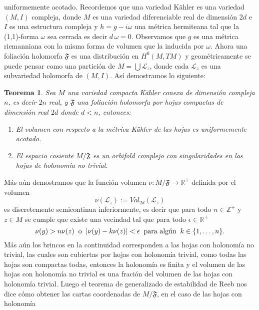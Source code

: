 \documentclass[letterpaper]{report}
\newtheorem{teorema}{Teorema}[chapter]
\newcommand{\zah}{\ensuremath{ \mathbb Z }}
\newcommand{\re}{\ensuremath{\mathbb R }}
\begin{document}
uniformemente acotado. Recordemos que una variedad K\"ahler es una variedad $(M,I)$ compleja, donde $M$ es una variedad 
diferenciable real de dimensi\'on $2d$ e $I$ es una estructura compleja y $h=g-i\omega$ una m\'etrica hermiteana tal que la (1,1)-forma $\omega$ sea cerrada
es decir $d\,\omega=0$. Observamos que $g$ es una m\'etrica riemanniana con la misma forma de volumen que la inducida por $\omega$. Ahora 
una foliaci\'on holomorfa $\mathfrak{F}$ es una distribuci\'on en $H^0(M,TM)$ y geom\'etricamente se puede pensar como una partici\'on 
de $M=\bigcup\mathcal{L}_z$, donde cada $\mathcal{L}_z$ es una subvariedad holomorfa de $(M,I)$. As\'i demostramos lo siguiente:
\begin{teorema}\label{EMS*}
        Sea $M$ una variedad compacta K\"ahler conexa de dimensi\'on compleja $n$, es decir $2n$ real, y $\mathfrak{F}$ una foliaci\'on holomorfa por hojas
        compactas de dimensi\'on real $2d$ donde $d<n$, entonces:
        \begin{enumerate}
                \item[a)] El volumen con respecto a la m\'etrica K\"ahler de las hojas es uniformemente acotado.
                \item[b)] El espacio cosiente $M/\mathfrak{F}$ es un orbifold complejo con singularidades en las hojas de holonomia no trivial.
        \end{enumerate}
\end{teorema}
M\'as a\'un demostramos que la funci\'on volumen $\nu:M/\mathfrak{F}\rightarrow\re^{+}$ definida por el volumen 
\[
        \nu(\mathcal{L}_z):=Vol_{2d}(\mathcal{L}_z)
\]
es discretemente semicontinua inferiormente, es decir que para todo $n\in\zah^{+}$ y $z\in M$ se cumple que existe una vecindad
tal que para todo $\epsilon\in\re^{+}$ 
\[
        \nu(y)>n\nu(z)\hspace{0.2cm}\text{o}\hspace{0.2cm}|\nu(y)-k\nu(z)|<\epsilon\hspace{0.2cm}\text{para alg\'un}\hspace{0.2cm}k\in\{1,\dots,n\}.
\]
\noindent M\'as a\'un los brincos en la continuidad corresponden a las hojas con holonom\'ia no trivial, las cuales son cubiertas
por hojas con holonom\'ia trivial, como todas las hojas son compactas todas, entonces la holonom\'ia es finita y el volumen de las hojas
con holonom\'ia no trivial es una fraci\'on del volumen de las hojas con holonom\'ia trivial. Luego el teorema de generalizado de 
estabilidad de Reeb \cite{Thurston} nos dice c\'omo obtener las cartas coordenadas de $M/\mathfrak{F}$, en el caso de las hojas con holonom\'ia 
\end{document}
